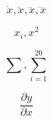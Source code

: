 \documentclass[a4paper]{article}
\begin{document}
    \begin{equation}
        \dot{x}, \ddot{x}, \dddot{x}, \ddddot{x} 
    \end{equation}

    \begin{equation}
        x_i, x^2 
    \end{equation}

    \begin{equation}
        \sum, \sum_{i=1}^{20}
    \end{equation}

    \begin{equation}
	\frac{\partial{y}}{\partial{x}}
    \end{equation}
\end{document}
